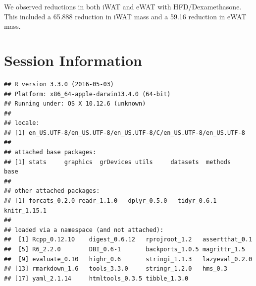 \documentclass[]{article}
\begin{document}
We observed reductions in both iWAT and eWAT with HFD/Dexamethasone.
This included a 65.888 reduction in iWAT mass and a 59.16 reduction in
eWAT mass.

\section{Session Information}\label{session-information}

\begin{verbatim}
## R version 3.3.0 (2016-05-03)
## Platform: x86_64-apple-darwin13.4.0 (64-bit)
## Running under: OS X 10.12.6 (unknown)
## 
## locale:
## [1] en_US.UTF-8/en_US.UTF-8/en_US.UTF-8/C/en_US.UTF-8/en_US.UTF-8
## 
## attached base packages:
## [1] stats     graphics  grDevices utils     datasets  methods   base     
## 
## other attached packages:
## [1] forcats_0.2.0 readr_1.1.0   dplyr_0.5.0   tidyr_0.6.1   knitr_1.15.1 
## 
## loaded via a namespace (and not attached):
##  [1] Rcpp_0.12.10    digest_0.6.12   rprojroot_1.2   assertthat_0.1 
##  [5] R6_2.2.0        DBI_0.6-1       backports_1.0.5 magrittr_1.5   
##  [9] evaluate_0.10   highr_0.6       stringi_1.1.3   lazyeval_0.2.0 
## [13] rmarkdown_1.6   tools_3.3.0     stringr_1.2.0   hms_0.3        
## [17] yaml_2.1.14     htmltools_0.3.5 tibble_1.3.0
\end{verbatim}
\end{document}
